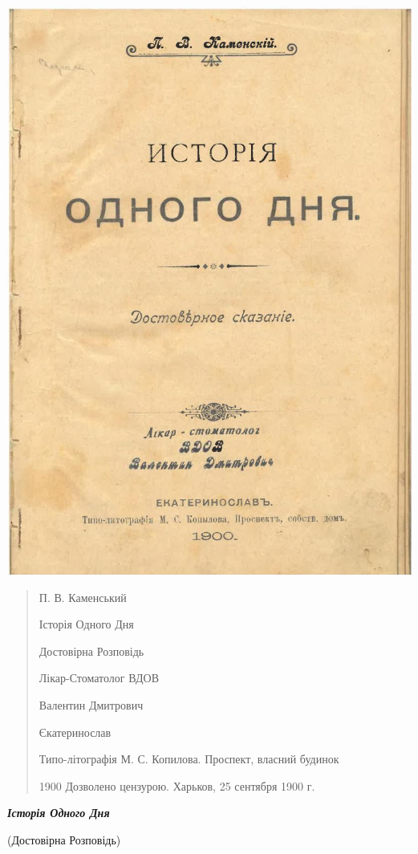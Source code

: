 \documentclass[a4paper,20pt]{report}
\begin{document}
\includegraphics[width=\textwidth]{istoria_odnogo_dnja_title_scan.png}

\begin{quote}
\em

П. В. Каменський

Історія Одного Дня

Достовірна Розповідь

Лікар-Стоматолог ВДОВ

Валентин Дмитрович

Єкатеринослав

Типо-літографія М. С. Копилова. Проспект, власний будинок

1900
Дозволено цензурою. Харьков, 25 сентября 1900 г.

\end{quote}

\begin{center}
\bfseries\em\Huge
Історія Одного Дня 

(Достовірна Розповідь)
\end{center}
\end{document}

